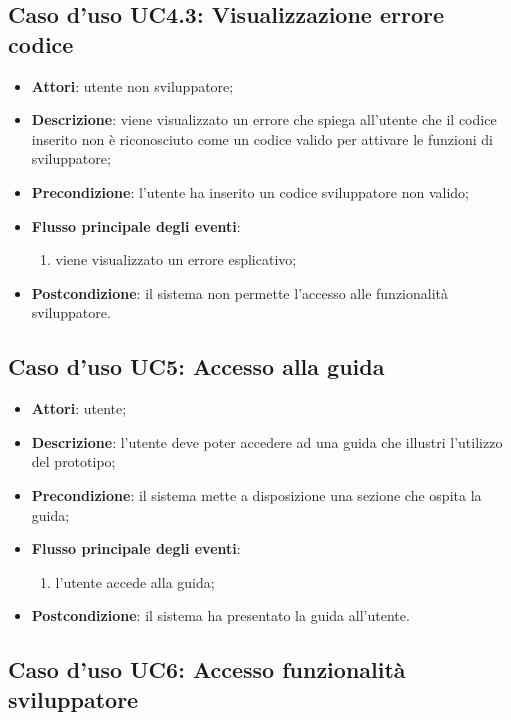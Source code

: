 \documentclass[../AnalisiDeiRequisiti.tex]{subfiles}
\begin{document}
\subsection{Caso d'uso UC4.3: Visualizzazione errore codice}
\begin{itemize}
\item \textbf{Attori}: utente non sviluppatore;
\item \textbf{Descrizione}: viene visualizzato un errore che spiega all'utente che il codice inserito non è riconosciuto come un codice valido per attivare le funzioni di sviluppatore; 
      \item \textbf{Precondizione}: l'utente ha inserito un codice sviluppatore non valido;

        \item \textbf{Flusso principale degli eventi}:
          \begin{enumerate}
          \item viene visualizzato un errore esplicativo;
      \end{enumerate}
    \item \textbf{Postcondizione}: il sistema non permette l'accesso alle funzionalità sviluppatore.
  \end{itemize}
\hypertarget{UC5}{}
\subsection{Caso d'uso UC5: Accesso alla guida}
\begin{itemize}
\item \textbf{Attori}: utente;
\item \textbf{Descrizione}: l'utente deve poter accedere ad una guida che illustri l'utilizzo del prototipo; 
      \item \textbf{Precondizione}: il sistema mette a disposizione una sezione che ospita la guida;

        \item \textbf{Flusso principale degli eventi}:
          \begin{enumerate}
          \item l'utente accede alla guida;

      \end{enumerate}
    \item \textbf{Postcondizione}: il sistema ha presentato la guida all'utente.
  \end{itemize}
\hypertarget{UC6}{}
\subsection{Caso d'uso UC6: Accesso funzionalità sviluppatore}
\end{document}
